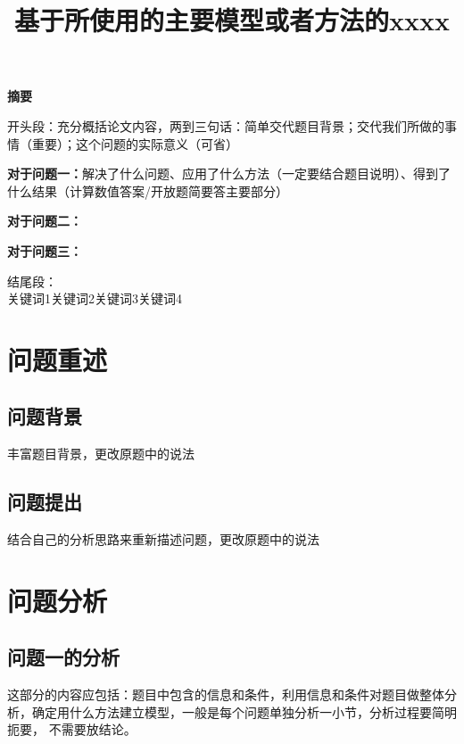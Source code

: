 \documentclass[a4paper,10.5pt]{ctexart}
\title{\textbf{基于所使用的主要模型或者方法的xxxx}}
\date{}
\begin{document}
	\maketitle
\begin{center}
\Large{\bf {摘\qquad 要}}
\end{center}


\par 开头段：充分概括论文内容，两到三句话：简单交代题目背景；交代我们所做的事情（重要）；这个问题的实际意义（可省）
\par \textbf{对于问题一：}解决了什么问题、应用了什么方法（一定要结合题目说明）、得到了什么结果（计算数值答案/开放题简要答主要部分）
\par \textbf{对于问题二：}
\par \textbf{对于问题三：}
\par 结尾段：
\\


		关键词1\quad 关键词2\quad 关键词3\quad 关键词4
\clearpage



\section{问题重述}
\subsection{问题背景}
\par 丰富题目背景，更改原题中的说法
\subsection{问题提出}
\par 结合自己的分析思路来重新描述问题，更改原题中的说法
\section{问题分析}
\subsection{问题一的分析}
\par 这部分的内容应包括：题目中包含的信息和条件，利用信息和条件对题目做整体分析，确定用什么方法建立模型，一般是每个问题单独分析一小节，分析过程要简明扼要， 不需要放结论。
\end{document}
